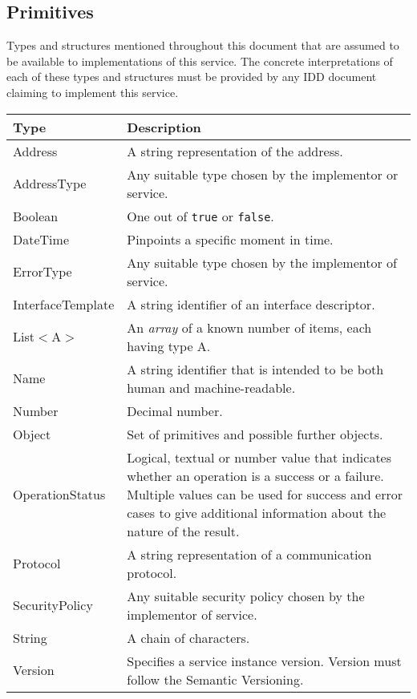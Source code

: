 \documentclass[a4paper]{arrowhead}
\newcommand{\pdef}[1]{{\textcolor{ArrowheadGrey}{#1\label{sec:model:primitives:#1}\label{sec:model:primitives:#1s}\label{sec:model:primitives:#1es}}}}
\begin{document}
\subsection{Primitives}
\label{sec:model:primitives}

Types and structures mentioned throughout this document that are assumed to be available to implementations of this service.
The concrete interpretations of each of these types and structures must be provided by any IDD document claiming to implement this service.


\begin{table}[ht!]
\begin{tabularx}{\textwidth}{| p{3cm} | X |} \hline
\rowcolor{gray!33} Type & Description \\ \hline
\pdef{Address}          & A string representation of the address. \\ \hline
\pdef{AddressType}      & Any suitable type chosen by the implementor or service. \\ \hline
\pdef{Boolean}          & One out of \texttt{true} or \texttt{false}. \\ \hline
\pdef{DateTime}         & Pinpoints a specific moment in time. \\ \hline
\pdef{ErrorType}        & Any suitable type chosen by the implementor of service. \\ \hline
\pdef{InterfaceTemplate} & A string identifier of an interface descriptor. \\ \hline
\pdef{List}$<$A$>$      & An \textit{array} of a known number of items, each having type A. \\ \hline
\pdef{Name}             & A string identifier that is intended to be both human and machine-readable. \\ \hline
\pdef{Number}           & Decimal number. \\ \hline
\pdef{Object}           & Set of primitives and possible further objects. \\ \hline
\pdef{OperationStatus}  & Logical, textual or number value that indicates whether an operation is a success or a failure. Multiple values can be used for success and error cases to give additional information about the nature of the result. \\ \hline
\pdef{Protocol}         & A string representation of a communication protocol. \\ \hline
\pdef{SecurityPolicy}   & Any suitable security policy chosen by the implementor of service. \\ \hline
\pdef{String}           & A chain of characters. \\ \hline
\pdef{Version}          & Specifies a service instance version. Version must follow the Semantic Versioning. \\ \hline
\end{tabularx}
\end{table}
\end{document}
